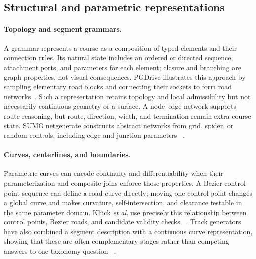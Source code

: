 \subsection{Structural and parametric representations}

\paragraph{Topology and segment grammars.}
A grammar represents a course as a composition of typed elements and their connection
rules. Its natural state includes an ordered or directed sequence, attachment ports,
and parameters for each element; closure and branching are graph properties, not
visual consequences. PGDrive illustrates this approach by sampling elementary road
blocks and connecting their sockets to form road networks~\cite{Li2020ImprovingGeneralization}.
Such a representation retains topology and local admissibility but not necessarily continuous geometry or a surface. A node--edge network supports route reasoning, but route, direction, width, and termination remain extra course state. SUMO netgenerate constructs abstract networks from grid, spider, or random controls, including edge and junction parameters
~\cite{EclipseSUMONodateNetgenerate}.

\paragraph{Curves, centerlines, and boundaries.}
Parametric curves can encode continuity and differentiability when their
parameterization and composite joins enforce those properties. A Bezier control-point
sequence can define a road curve directly; moving one control point changes a global
curve and makes curvature, self-intersection, and clearance testable in the same
parameter domain. Kl\"uck \emph{et al.} use precisely this relationship between
control points, Bezier roads, and candidate validity checks
~\cite{Kluck2021AutomaticGeneration}. Track generators have also combined a segment
description with a continuous curve representation, showing that these are often
complementary stages rather than competing answers to one taxonomy question
~\cite{Loiacono2011AutomaticTrack}.

